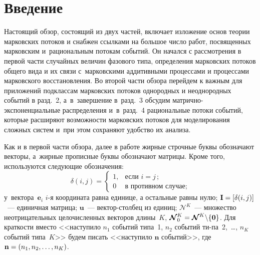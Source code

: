   
\vspace*{6pt}



\thispagestyle{headings}

\begin{multicols}{2}

\label{st\stat}


\section{Введение}

Настоящий обзор, состоящий из двух частей, включает изложение основ 
теории марковских потоков и снабжен ссылками на большое число работ, 
посвященных марковским и~рациональным потокам событий. Он начался с 
рассмотрения в первой части случайных величин фазового типа, определения 
марковских потоков общего вида и их связи с~марковскими аддитивными 
процессами и процессами марковского восстановления. Во второй части 
обзора  перейдем к важным для приложений подклассам марковских потоков 
однородных и неоднородных событий в разд.~2, а~в~завершение в~разд.~3 
обсудим  
мат\-рич\-но-экс\-по\-нен\-ци\-аль\-ные распределения и~в~разд.~4 
рациональные потоки событий, которые расширяют возможности марковских 
потоков для моделирования сложных систем и~при этом сохраняют удобство 
их анализа. 

Как и в первой части обзора, далее в работе жирные строчные буквы 
обозначают векторы, а~жирные прописные буквы обозначают матрицы. 
Кроме того, используются следующие обозначения: 
$$
\delta(i,j)= \begin{cases}
1, &\mbox{если } i=j\,;\\
0 & \mbox{в~противном\ случае};
\end{cases}
$$
 у~вектора~$\mathbf{e}_i$ 
$i$-я координата равна единице, а остальные равны нулю; $\mathbf{I}\hm= \left[ 
\delta(i,j)\right]$~--- единичная матрица; $\mathbf{u}$~---  
век\-тор-стол\-бец из единиц; $\boldsymbol{\mathcal{N}}^K$~--- множество 
неотрицательных целочисленных векторов длины~$K$, 
$\boldsymbol{\mathcal{N}}^K _0\hm= \boldsymbol{\mathcal{N}}^K \backslash 
\{\mathbf{0}\}$. Для краткости вмес\-то <<наступило $n_1$ событий типа~1, 
$n_2$ событий ти-\linebreak па~2,~\ldots , $n_K$ событий типа~$K$>> будем писать 
<<наступило $\mathbf{n}$ событий>>, где $\mathbf{n}\hm= \left( n_1, n_2, 
\ldots , n_K\right)$.


\end{multicols}
